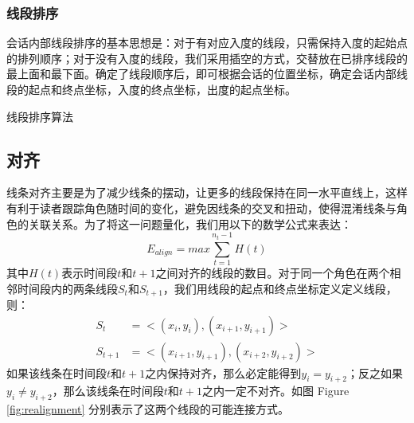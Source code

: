 \subsubsection{线段排序}
会话内部线段排序的基本思想是：对于有对应入度的线段，只需保持入度的起始点的排列顺序；对于没有入度的线段，我们采用插空的方式，交替放在已排序线段的最上面和最下面。确定了线段顺序后，即可根据会话的位置坐标，确定会话内部线段的起点和终点坐标，入度的终点坐标，出度的起点坐标。
\begin{algorithm}[H]
	\caption{线段排序算法}
	\label{algo:line-segment-order}
\end{algorithm}

\subsection{对齐}
线条对齐主要是为了减少线条的摆动，让更多的线段保持在同一水平直线上，这样有利于读者跟踪角色随时间的变化，避免因线条的交叉和扭动，使得混淆线条与角色的关联关系。为了将这一问题量化，我们用以下的数学公式来表达：
\begin{equation}
\label{align-global}
E_{align} = max \sum_{t=1}^{n_t-1} H\left(t\right)
\end{equation}
其中$H\left(t\right)$表示时间段$t$和$t+1$之间对齐的线段的数目。对于同一个角色在两个相邻时间段内的两条线段$S_t$和$S_{t+1}$，我们用线段的起点和终点坐标定义定义线段，则：
\begin{subequations}
\begin{align}
	S_t & = <(x_i, y_i), (x_{i+1},y_{i+1})> \label{eq:segment-1}\\
	S_{t+1} & = <(x_{i+1}, y_{i+1}), (x_{i+2},y_{i+2})> \label{eq:segment-2}
\end{align}
\end{subequations}
如果该线条在时间段$t$和$t+1$之内保持对齐，那么必定能得到$y_i = y_{i+2}$；反之如果$y_i \neq y_{i+2}$，那么该线条在时间段$t$和$t+1$之内一定不对齐。如图 Figure \ref{fig:realignment} 分别表示了这两个线段的可能连接方式。

